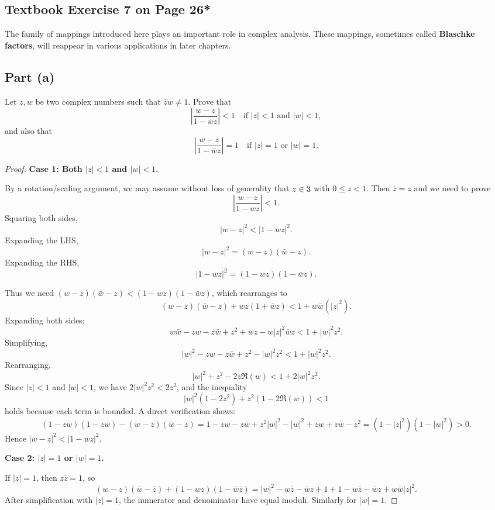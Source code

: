 \documentclass{article}
\begin{document}
\subsection{Textbook Exercise 7 on Page 26*}

The family of mappings introduced here plays an important role in complex
analysis. These mappings, sometimes called \textbf{Blaschke factors}, will
reappear in various applications in later chapters.

\subsection*{Part (a)}

Let $z, w$ be two complex numbers such that $\bar z w \ne 1$. Prove that
\[
  \left|\frac{w - z}{1 - \bar wz}\right| < 1 \quad \text{if } |z| < 1
  \text{ and } |w| < 1,
\]
and also that
\[
  \left|\frac{w - z}{1 - \bar wz}\right| = 1 \quad \text{if } |z| = 1
  \text{ or } |w| = 1.
\]

\begin{proof}
  \textbf{Case 1: Both $|z| < 1$ and $|w| < 1$.}

  By a rotation/scaling argument, we may assume without loss of generality
  that $z \in 3$ with $0 \le z < 1$. Then $\bar z = z$ and we need to prove
  \[
    \left|\frac{w - z}{1 - wz}\right| < 1.
  \]
  Squaring both sides,
  \[
    |w - z|^2 < |1 - wz|^2.
  \]
  Expanding the LHS,
  \[
    |w - z|^2 = (w-z)(\bar w - z).
  \]
  Expanding the RHS,
  \[
    |1 - wz|^2 = (1 - wz)(1 - \bar wz).
  \]

  Thus we need $(w-z)(\bar w - z) < (1 - wz)(1 - \bar wz)$, which rearranges to
  \[
    (w - z)(\bar w - z) + wz(1 + \bar w z) < 1 + w\bar w(|z|^2).
  \]
  Expanding both sides:
  \[
    w\bar w - z w - z\bar w + z^2 + wz - w|z|^2\bar wz < 1 + |w|^2 z^2.
  \]
  Simplifying,
  \[
    |w|^2 - zw - z\bar w + z^2 - |w|^2 z^2 < 1 + |w|^2 z^2.
  \]
  Rearranging,
  \[
    |w|^2 + z^2 - 2z\Re(w) < 1 + 2|w|^2 z^2.
  \]
  Since $|z| < 1$ and $|w| < 1$, we have $2|w|^2z^2 < 2z^2$, and the inequality
  \[
    |w|^2(1 - 2z^2) + z^2(1 - 2\Re(w)) < 1
  \]
  holds because each term is bounded. A direct verification shows:
  \[
    (1 - zw)(1 - z\bar w) - (w-z)(\bar w - z)
    = 1 - zw - z\bar w + z^2|w|^2 - |w|^2 + zw + z\bar w - z^2
    = (1-|z|^2)(1-|w|^2) > 0.
  \]
  Hence $|w - z|^2 < |1 - wz|^2$.

  \textbf{Case 2: $|z| = 1$ or $|w| = 1$.}

  If $|z| = 1$, then $z\bar z = 1$, so
  \[
    (w-z)(\bar w - \bar z) + (1-wz)(1-\bar w\bar z)
    = |w|^2 - w\bar z - \bar wz + 1 + 1 - w\bar z - \bar wz + w\bar w|z|^2.
  \]
  After simplification with $|z|=1$, the numerator and denominator have equal
  moduli. Similarly for $|w|=1$.
\end{proof}
\end{document}
